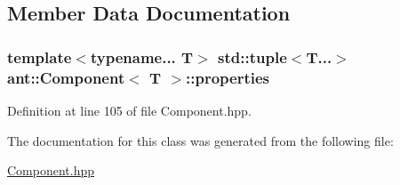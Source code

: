 \subsection{Member Data Documentation}
\hypertarget{classant_1_1_component_af9e7b330e3e1e3599b1e81936a139913}{
\subsubsection[{properties}]{\setlength{\rightskip}{0pt plus 5cm}template$<$typename... T$>$ std\+::tuple$<$T...$>$ {\bf ant\+::\+Component}$<$ T $>$\+::properties\hspace{0.3cm}{\ttfamily [private]}}}\label{classant_1_1_component_af9e7b330e3e1e3599b1e81936a139913}


Definition at line 105 of file Component.\+hpp.



The documentation for this class was generated from the following file\+:\begin{DoxyCompactItemize}
\item 
\hyperlink{_component_8hpp}{Component.\+hpp}\end{DoxyCompactItemize}
